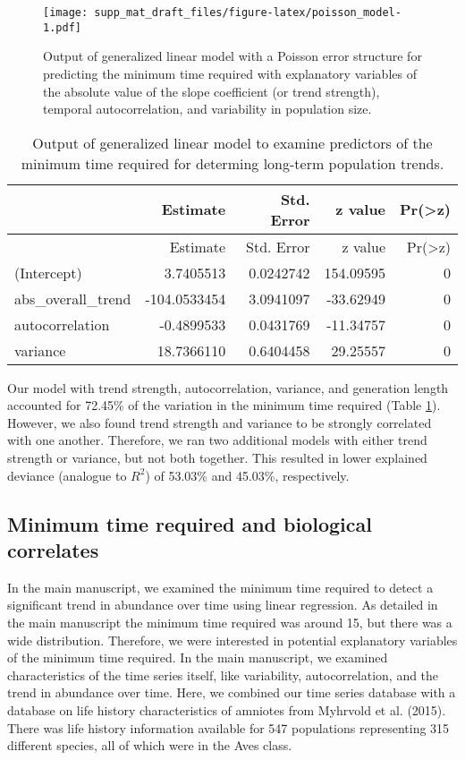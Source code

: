 \documentclass[12pt,]{article}
\begin{document}
\begin{figure}[htbp]
\centering
\texttt{[image: supp\_mat\_draft\_files/figure-latex/poisson\_model-1.pdf]}
\caption{Output of generalized linear model with a Poisson error
structure for predicting the minimum time required with explanatory
variables of the absolute value of the slope coefficient (or trend
strength), temporal autocorrelation, and variability in population
size.\label{fig:poisson_model}}
\end{figure}

\begin{longtable}[]{@{}lrrrr@{}}
\caption{Output of generalized linear model to examine predictors of the
minimum time required for determing long-term population
trends.\label{table:model_output}}\tabularnewline
\toprule
& Estimate & Std. Error & z value &
Pr(\textgreater{}\textbar{}z\textbar{})\tabularnewline
\midrule
\endfirsthead
\toprule
& Estimate & Std. Error & z value &
Pr(\textgreater{}\textbar{}z\textbar{})\tabularnewline
\midrule
\endhead
(Intercept) & 3.7405513 & 0.0242742 & 154.09595 & 0\tabularnewline
abs\_overall\_trend & -104.0533454 & 3.0941097 & -33.62949 &
0\tabularnewline
autocorrelation & -0.4899533 & 0.0431769 & -11.34757 & 0\tabularnewline
variance & 18.7366110 & 0.6404458 & 29.25557 & 0\tabularnewline
\bottomrule
\end{longtable}

Our model with trend strength, autocorrelation, variance, and generation
length accounted for 72.45\% of the variation in the minimum time
required (Table \ref{table:model_output}). However, we also found trend
strength and variance to be strongly correlated with one another.
Therefore, we ran two additional models with either trend strength or
variance, but not both together. This resulted in lower explained
deviance (analogue to \(R^2\)) of 53.03\% and 45.03\%, respectively.

\pagebreak 

\subsection{Minimum time required and biological
correlates}\label{minimum-time-required-and-biological-correlates}

In the main manuscript, we examined the minimum time required to detect
a significant trend in abundance over time using linear regression. As
detailed in the main manuscript the minimum time required was around 15,
but there was a wide distribution. Therefore, we were interested in
potential explanatory variables of the minimum time required. In the
main manuscript, we examined characteristics of the time series itself,
like variability, autocorrelation, and the trend in abundance over time.
Here, we combined our time series database with a database on life
history characteristics of amniotes from Myhrvold et al. (2015). There
was life history information available for 547 populations representing
315 different species, all of which were in the Aves class.
\end{document}
